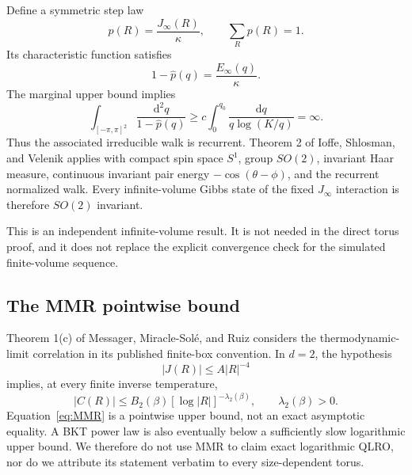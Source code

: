 \documentclass[aps,prb,preprint,notitlepage,groupedaddress,amsmath,amssymb,
               superscriptaddress,nofootinbib,floatfix]{revtex4-2}
\theoremstyle{definition}
\theoremstyle{plain}
\newcommand{\dd}{\mathrm{d}}
\begin{document}
Define a symmetric step law
\begin{equation}
 p(R)=\frac{J_\infty(R)}{\kappa},\qquad\sum_Rp(R)=1.
\end{equation}
Its characteristic function satisfies
\begin{equation}
 1-\widehat p(q)=\frac{E_\infty(q)}{\kappa}.
\end{equation}
The marginal upper bound implies
\begin{equation}
 \int_{[-\pi,\pi]^2}
 \frac{\dd^2q}{1-\widehat p(q)}
 \ge c\int_0^{q_0}\frac{\dd q}{q\log(K/q)}
 =\infty.
\end{equation}
Thus the associated irreducible walk is recurrent.  Theorem 2 of
Ioffe, Shlosman, and Velenik \cite{Ioffe2002} applies with compact spin
space $S^1$, group $SO(2)$, invariant Haar measure, continuous invariant
pair energy $-\cos(\theta-\phi)$, and the recurrent normalized walk.
Every infinite-volume Gibbs state of the fixed $J_\infty$ interaction is
therefore $SO(2)$ invariant.

This is an independent infinite-volume result.  It is not needed in the
direct torus proof, and it does not replace the explicit convergence check
for the simulated finite-volume sequence.

\subsection{The MMR pointwise bound}

Theorem 1(c) of Messager, Miracle-Sol{\'e}, and Ruiz
\cite{Messager1984} considers the thermodynamic-limit correlation in its
published finite-box convention.  In $d=2$, the hypothesis
\begin{equation}
 |J(R)|\le A|R|^{-4}
\end{equation}
implies, at every finite inverse temperature,
\begin{equation}
 |C(R)|\le B_2(\beta)[\log|R|]^{-\lambda_2(\beta)},
 \qquad\lambda_2(\beta)>0.
 \label{eq:MMR}
\end{equation}
Equation~\eqref{eq:MMR} is a pointwise upper bound, not an exact asymptotic
equality.  A BKT power law is also eventually below a sufficiently slow
logarithmic upper bound.  We therefore do not use MMR to claim exact
logarithmic QLRO, nor do we attribute its statement verbatim to every
size-dependent torus.
\end{document}
